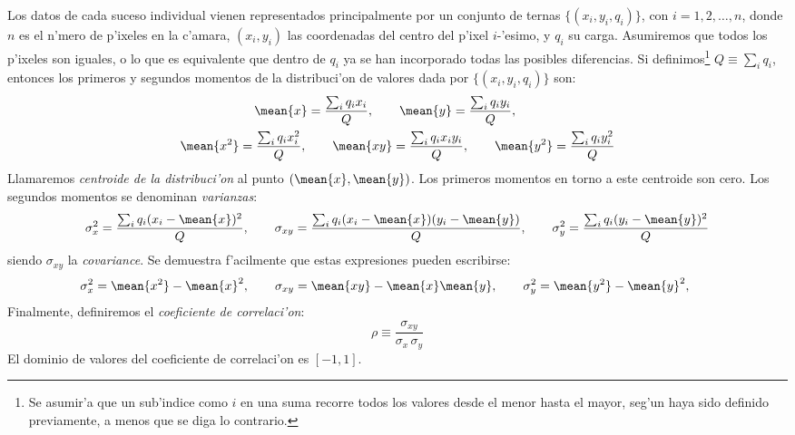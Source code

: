 Los datos de cada suceso individual vienen representados
principalmente por un conjunto de ternas $\{(x_i, y_i, q_i)\}$, con
$i=1,2,\ldots,n$, donde $n$ es el n'mero de p'ixeles en la c'amara,
$(x_i, y_i)$ las coordenadas del centro del p'ixel $i$-'esimo, y $q_i$
su carga. Asumiremos que todos los p'ixeles son iguales, o lo que es
equivalente que dentro de $q_i$ ya se han incorporado todas las
posibles diferencias. Si definimos\footnote{Se asumir'a que un
  sub'indice como $i$ en una suma recorre todos los valores desde el
  menor hasta el mayor, seg'un haya sido definido previamente, a menos
  que se diga lo contrario.} $Q\equiv\sum_i q_i$, entonces los
primeros y segundos momentos de la distribuci'on de valores dada por
$\{(x_i, y_i, q_i)\}$ son:
%
\begin{gather}
  \label{eq:defmeans}
  \mean{x} = \frac{\sum_i q_i x_i}{Q}, \qquad
  \mean{y} = \frac{\sum_i q_i y_i}{Q}, \qquad
  \\
  \label{eq:defmeans2}
  \mean{x^2} = \frac{\sum_i q_i x_i^2}{Q}, \qquad
  \mean{xy} = \frac{\sum_i q_i x_i y_i}{Q}, \qquad
  \mean{y^2} = \frac{\sum_i q_i y_i^2}{Q}
\end{gather}
%
Llamaremos \emph{centroide de la distribuci'on} al punto
$(\mean{x},\mean{y})$. Los primeros momentos en torno a este centroide
son cero. Los segundos momentos se denominan \emph{varianzas}:
%
\begin{equation}
  \label{eq:defvar}
  \sigma_x^2  = \frac{\sum_i q_i (x_i - \mean{x})^2}{Q}, \qquad
  \sigma_{xy} = \frac{\sum_i q_i 
    (x_i - \mean{x})(y_i - \mean{y})}{Q}, \qquad
  \sigma_y^2  = \frac{\sum_i q_i (y_i - \mean{y})^2}{Q}
\end{equation}
%
siendo $\sigma_{xy}$ la \emph{covariance}. Se demuestra f'acilmente
que estas expresiones pueden escribirse:
%
\begin{equation}
  \label{eq:defvarbis}
  \sigma_x^2  = \mean{x^2} - \mean{x}^2, \qquad 
  \sigma_{xy}  = \mean{xy} - \mean{x}\mean{y}, \qquad 
  \sigma_y^2  = \mean{y^2} - \mean{y}^2, \qquad 
\end{equation}
%
Finalmente, definiremos el \emph{coeficiente de correlaci'on}:
\begin{equation}
  \label{eq:corr}
  \rho\equiv\frac{\sigma_{xy}}{\sigma_x\, \sigma_y}
\end{equation}
%
El dominio de valores del coeficiente de correlaci'on es $[-1,1]$.

